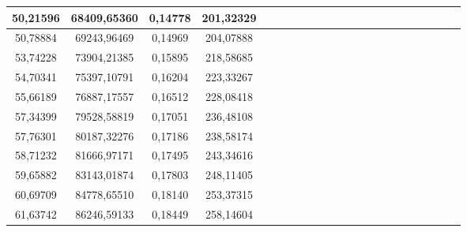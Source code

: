 \documentclass[10pt,a4paper]{article}
\begin{document}
\begin{center}
\begin{center}
\begin{table}[h!]
\begin{tabular}{|c|c|c|c|c|c|c|c|c|c|c|c|c|c|c|c|c|c|c|c|c|c|}
50,21596                    & 68409,65360                   & 0,14778                                      & 201,32329                   \\ \hline
50,78884                    & 69243,96469                   & 0,14969                                      & 204,07888                   \\ \hline
53,74228                    & 73904,21385                   & 0,15895                                      & 218,58685                   \\ \hline
54,70341                    & 75397,10791                   & 0,16204                                      & 223,33267                   \\ \hline
55,66189                    & 76887,17557                   & 0,16512                                      & 228,08418                   \\ \hline
57,34399                    & 79528,58819                   & 0,17051                                      & 236,48108                   \\ \hline
57,76301                    & 80187,32276                   & 0,17186                                      & 238,58174                   \\ \hline
58,71232                    & 81666,97171                   & 0,17495                                      & 243,34616                   \\ \hline
59,65882                    & 83143,01874                   & 0,17803                                      & 248,11405                   \\ \hline
60,69709                    & 84778,65510                   & 0,18140                                      & 253,37315                   \\ \hline
61,63742                    & 86246,59133                   & 0,18449                                      & 258,14604                   \\ \hline
 \end{tabular}
 \end{table}
 \end{center}



\end{center}
\end{document}
